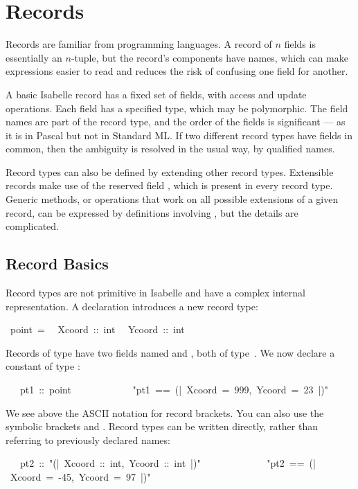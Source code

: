 \section{Records} 
\label{sec:records}

%
Records are familiar from programming languages.  A record of $n$
fields is essentially an $n$-tuple, but the record's components have
names, which can make expressions easier to read and reduces the risk
of confusing one field for another.

A basic Isabelle record has a fixed set of fields, with access
and update operations.  Each field has a specified type, which may be
polymorphic.  The field names are part of the record type, and the
order of the fields is significant --- as it is in Pascal but not in
Standard ML.  If two different record types have fields in common,
then the ambiguity is resolved in the usual way, by qualified names.

Record types can also be defined by extending other record types. 
Extensible records make use of the reserved field , which is
present in every record type.  Generic methods, or operations that
work on all possible extensions of a given record, can be expressed by
definitions involving , but the details are complicated.

\subsection{Record Basics}

Record types are not primitive in Isabelle and have a complex internal
representation.  A  declaration
introduces a new record type:
\begin{isabelle}
\ point\ =\isanewline
\ \ Xcoord\ ::\ int\isanewline
\ \ Ycoord\ ::\ int
\end{isabelle}

Records of type  have two fields named  and ,
both of type~.  We now declare a constant of type
:
\begin{isabelle}
\ \ \ pt1\ ::\ point\isanewline
\ \ \ \ \ \ \ \ \ \ \ \ "pt1\ ==\ (|\ Xcoord\ =\ 999,\ Ycoord\ =\ 23\ |)"
\end{isabelle}
We see above the ASCII notation for record brackets.  You can also use
the symbolic brackets \isa{\isasymlparr} and  \isa{\isasymrparr}.
Record types can be written directly, rather than referring to
previously declared names: 
\begin{isabelle}
\ \ \ pt2\ ::\ "(|\ Xcoord\ ::\ int,\ Ycoord\ ::\ int\
|)"\ \isanewline
\ \ \ \ \ \ \ \ \ \ \ \ "pt2\ ==\ (|\ Xcoord\ =\ -45,\ Ycoord\ =\ 97\ |)"
\end{isabelle}

